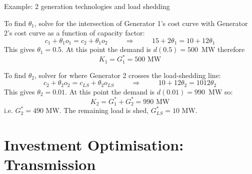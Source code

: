 \documentclass[10pt,aspectratio=169,dvipsnames]{beamer}
\begin{document}
\begin{frame}{Example: 2 generation technologies and load shedding}

  To find $\theta_1$, solve for the intersection of Generator 1's cost curve with Generator 2's cost curve as a function of capacity factor:
  \begin{equation*}
    c_1 + \theta_1 o_1 = c_2 + \theta_1 o_2 \hspace{1cm} \Rightarrow  \hspace{1cm} 15 + 2 \theta_1 = 10 + 12 \theta_1
  \end{equation*}
  This gives $\theta_1 = 0.5$. At this point the demand is $d(0.5) = 500$~MW therefore
  \begin{equation*}
    K_1 = G_1^* = 500\textrm{ MW}
  \end{equation*}

  To find $\theta_2$, solver for where Generator 2 crosses the load-shedding line:
  \begin{equation*}
    c_2 + \theta_2 o_2 = c_{LS} + \theta_2 o_{LS} \hspace{1cm} \Rightarrow  \hspace{1cm} 10 + 12 \theta_2 = 1012 \theta_2
  \end{equation*}
  This gives $\theta_2 = 0.01$. At this point the demand is $d(0.01) = 990$~MW so:
  \begin{equation*}
    K_2 =     G_1^* + G_2^* = 990\textrm{ MW}
  \end{equation*}
  i.e. $G_2^* = 490$ MW. The remaining load is shed, $G_{LS}^* = 10$ MW.

\end{frame}

\section{Investment Optimisation: Transmission}
\end{document}
